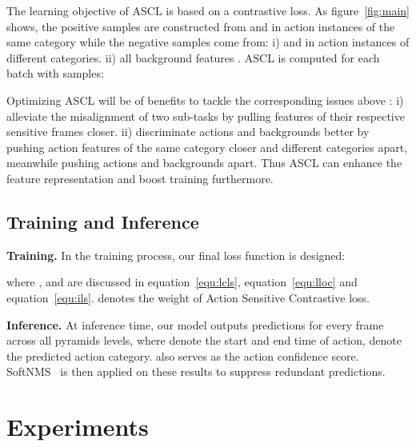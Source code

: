 \documentclass[10pt,twocolumn,letterpaper]{article}
\begin{document}
\par The learning objective of ASCL is based on a contrastive loss. As figure~\ref{fig:main} shows, the positive samples  are constructed from  and  in action instances of the same category while the negative samples  come from: i)  and  in action instances of different categories. ii) all background features . ASCL is computed for each batch  with  samples: 

\par Optimizing ASCL will be of benefits to tackle the corresponding issues above : 
i) alleviate the misalignment of two sub-tasks by pulling features of their respective sensitive frames closer.
ii) discriminate actions and backgrounds better by pushing action features of the same category closer and different categories apart, meanwhile pushing actions and backgrounds apart. Thus ASCL can enhance the feature representation and boost training furthermore.


\subsection{Training and Inference}
\label{sec:trainandinfer}
\textbf{Training.} In the training process, our final loss function is designed: 

where ,  and  are discussed in equation~\ref{equ:lcls}, equation~\ref{equ:lloc} and equation~\ref{equ:ils}.  denotes the weight of Action Sensitive Contrastive loss.


\textbf{Inference.} At inference time, our model outputs predictions  for every frame across all pyramids levels, where  denote the start and end time of action,  denote the predicted action category.  also serves as the action confidence score. SoftNMS~\cite{softnms} is then applied on these results to suppress redundant predictions.

\section{Experiments}
\end{document}
